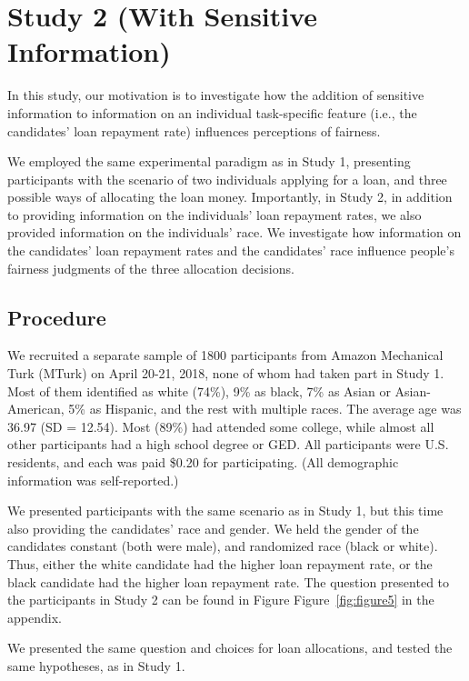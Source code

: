 \documentclass[letterpaper]{article} %
\begin{document}
 
 \section{Study 2 (With Sensitive Information)}
In this study, our motivation is to investigate how the addition of sensitive information to information on an individual task-specific feature (i.e., the candidates' loan repayment rate) influences perceptions of fairness.

We employed the same experimental paradigm as in Study 1, presenting participants with the scenario of two individuals applying for a loan, and three possible ways of allocating the loan money. Importantly, in Study 2, in addition to providing information on the individuals' loan repayment rates, we also provided information on the individuals' race. We investigate how information on the candidates' loan repayment rates and the candidates' race influence people's fairness judgments of the three allocation decisions.


 
 
\subsection{Procedure}

We recruited a separate sample of 1800 participants from Amazon Mechanical Turk (MTurk) on April 20-21, 2018, none of whom had taken part in Study 1. Most of them identified as white (74\%), 9\% as black, 7\% as Asian or Asian-American, 5\% as Hispanic, and the rest with multiple races. The average age was 36.97 (SD = 12.54). Most (89\%) had attended some college, while almost all other participants had a high school degree or GED. All participants were U.S. residents, and each was paid \$0.20 for participating. (All demographic information was self-reported.)  

We presented participants with the same scenario as in Study 1, but this time also providing the candidates' race and gender. We held the gender of the candidates constant (both were male), and randomized race (black or white). Thus, either the white candidate had the higher loan repayment rate, or the black candidate had the higher loan repayment rate. The question presented to the participants in Study 2 can be found in Figure Figure~\ref{fig:figure5} in the appendix.

We presented the same question and choices for loan allocations, and tested the same hypotheses, as in Study 1.
\end{document}
